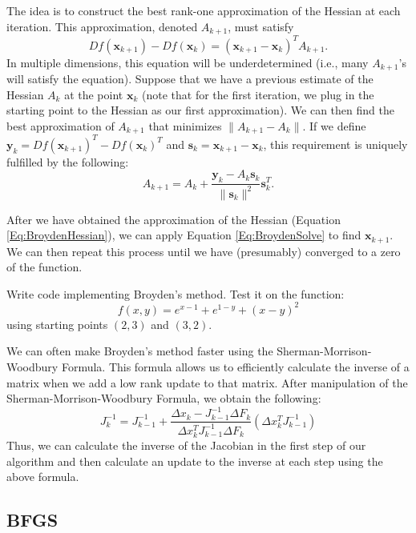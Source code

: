 The idea is to construct the best rank-one approximation of the Hessian at each iteration. This approximation, denoted $A_{k+1}$, must satisfy
\begin{equation} \label{Eq:BroydenRestraint}
Df(\mathbf{x}_{k+1})-Df(\mathbf{x}_k)=(\mathbf{x}_{k+1}-\mathbf{x}_k)^TA_{k+1}.
\end{equation}
In multiple dimensions, this equation will be underdetermined (i.e., many $A_{k+1}$'s will satisfy the equation). Suppose that we have a previous estimate of the Hessian $A_k$ at the point $\mathbf{x}_k$ (note that for the first iteration, we plug in the starting point to the Hessian as our first approximation). We can then find the best approximation of $A_{k+1}$ that minimizes $\|A_{k+1}-A_k\|$. If we define $\mathbf{y}_k = Df(\mathbf{x}_{k+1})^T-Df(\mathbf{x}_k)^T$ and $\mathbf{s}_k=\mathbf{x}_{k+1}-\mathbf{x}_k$, this requirement is uniquely fulfilled by the following:
\begin{equation} \label{Eq:BroydenHessian}
A_{k+1} = A_k + \frac{\mathbf{y}_k-A_k\mathbf{s}_k}{\|\mathbf{s}_k\|^2}\mathbf{s}_k^T.
\end{equation}

After we have obtained the approximation of the Hessian (Equation \ref{Eq:BroydenHessian}), we can apply Equation \ref{Eq:BroydenSolve} to find $\mathbf{x}_{k+1}$. We can then repeat this process until we have (presumably) converged to a zero of the function. 

\begin{problem}
Write code implementing Broyden's method. Test it on the function:
\[
f(x,y) = e^{x-1}+e^{1-y}+(x-y)^2
\]
using starting points $(2,3)$ and $(3,2)$.
\end{problem}

\begin{info}
We can often make Broyden's method faster using the Sherman-Morrison-Woodbury Formula.
This formula allows us to efficiently calculate the inverse of a matrix when we add
a low rank update to that matrix. After manipulation of the Sherman-Morrison-Woodbury
Formula, we obtain the following:
\[
J_k^{-1} = J_{k-1}^{-1} + \frac{\Delta x_k - J_{k-1}^{-1}\Delta F_k}{\Delta x_k^T J_{k-1}^{-1}\Delta F_k} (\Delta x_k^T J_{k-1}^{-1})
\]
Thus, we can calculate the inverse of the Jacobian in the first step of our algorithm
and then calculate an update to the inverse at each step using the above formula.
\end{info}

\subsection*{BFGS}


